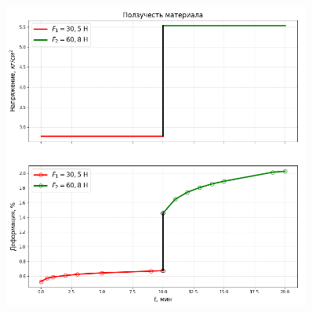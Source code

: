 \documentclass[a4paper,12pt]{article}
\begin{document}
\begin{figure}[H]\label{fig: eps(t) sigm(t)}
    \centering
    \includegraphics[width = 0.9\textwidth]{Eps and Sigm ot t.png}
\end{figure}


\end{document}
